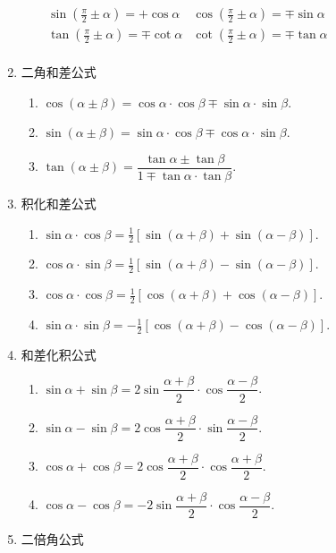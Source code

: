 \begin{enumerate}
\begin{enumerate}
		\(
		\begin{array}{ll}
			\sin(\frac{\pi}{2} \pm \alpha) = + \cos\alpha & \cos(\frac{\pi}{2} \pm \alpha) = \mp \sin \alpha \\
			\tan(\frac{\pi}{2} \pm \alpha) = \mp \cot\alpha & \cot(\frac{\pi}{2} \pm \alpha) = \mp\tan\alpha \\
		\end{array}
		\)
	\end{enumerate}
	\item 二角和差公式
	\begin{enumerate}
		\item \( \cos (\alpha \pm \beta) = \cos\alpha\cdot\cos\beta \mp \sin\alpha\cdot\sin\beta \).
		\item \( \sin(\alpha \pm \beta) = \sin\alpha\cdot\cos\beta \mp \cos\alpha\cdot\sin\beta \).
		\item \( \tan(\alpha \pm \beta) = \displaystyle\dfrac{\tan\alpha \pm \tan\beta}{1 \mp \tan\alpha\cdot\tan\beta} \).
	\end{enumerate}
	\item 积化和差公式
	\begin{enumerate}
		\item \( \sin\alpha\cdot\cos\beta = \frac{1}{2}[\sin(\alpha + \beta) + \sin(\alpha - \beta)] \).
		\item \( \cos\alpha\cdot\sin\beta = \frac{1}{2}[\sin(\alpha + \beta) - \sin(\alpha - \beta)] \).
		\item \( \cos\alpha\cdot\cos\beta = \frac{1}{2}[\cos(\alpha + \beta) + \cos(\alpha - \beta)] \).
		\item \( \sin\alpha\cdot\sin\beta = -\frac{1}{2}[\cos(\alpha + \beta) - \cos(\alpha - \beta)] \).
	\end{enumerate}
	\item 和差化积公式
	\begin{enumerate}
		\item \( \sin\alpha + \sin\beta = 2\sin\dfrac{\alpha + \beta}{2} \cdot \cos\dfrac{\alpha - \beta}{2} \).
		\item \( \sin\alpha - \sin\beta = 2\cos\dfrac{\alpha + \beta}{2} \cdot \sin\dfrac{\alpha - \beta}{2} \).
		\item \( \cos\alpha + \cos\beta = 2\cos\dfrac{\alpha + \beta}{2} \cdot \cos\dfrac{\alpha + \beta}{2} \).
		\item \( \cos\alpha - \cos\beta = -2\sin\dfrac{\alpha + \beta}{2} \cdot \cos\dfrac{\alpha - \beta}{2} \).
	\end{enumerate}
	\item 二倍角公式

\end{enumerate}
